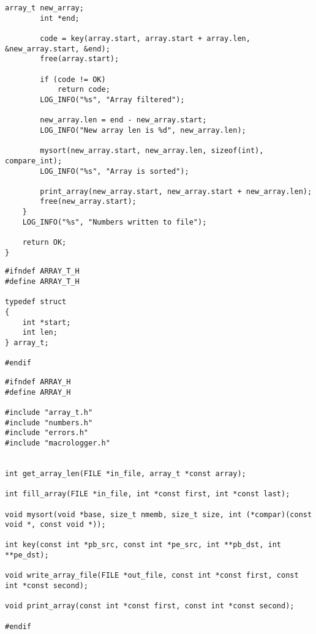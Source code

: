 \begin{center}
\begin{lstlisting}[label=lst:main,caption=main.c]
        array_t new_array;
        int *end;

        code = key(array.start, array.start + array.len, &new_array.start, &end);
        free(array.start);

        if (code != OK)
            return code;
        LOG_INFO("%s", "Array filtered");

        new_array.len = end - new_array.start;
        LOG_INFO("New array len is %d", new_array.len);

        mysort(new_array.start, new_array.len, sizeof(int), compare_int);
        LOG_INFO("%s", "Array is sorted");
        
        print_array(new_array.start, new_array.start + new_array.len);
        free(new_array.start);
    }
    LOG_INFO("%s", "Numbers written to file");
   
    return OK;
}
\end{lstlisting}
\end{center}

\clearpage

\begin{center}
    \captionsetup{justification=raggedright,singlelinecheck=off}
    \begin{lstlisting}[label=lst:arrayt,caption=array\_t.h]
#ifndef ARRAY_T_H
#define ARRAY_T_H

typedef struct
{
    int *start;
    int len;
} array_t;

#endif
\end{lstlisting}
\end{center}

\begin{center}
    \captionsetup{justification=raggedright,singlelinecheck=off}
    \begin{lstlisting}[label=lst:array,caption=array.h]
#ifndef ARRAY_H
#define ARRAY_H

#include "array_t.h"
#include "numbers.h"
#include "errors.h"
#include "macrologger.h"


int get_array_len(FILE *in_file, array_t *const array);

int fill_array(FILE *in_file, int *const first, int *const last);

void mysort(void *base, size_t nmemb, size_t size, int (*compar)(const void *, const void *));

int key(const int *pb_src, const int *pe_src, int **pb_dst, int **pe_dst);

void write_array_file(FILE *out_file, const int *const first, const int *const second);

void print_array(const int *const first, const int *const second);

#endif
\end{lstlisting}
\end{center}

